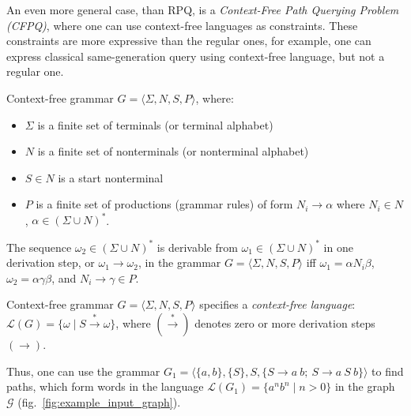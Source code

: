 An even more general case, than RPQ, is a \textit{Context-Free Path Querying Problem (CFPQ)}, where one can use context-free languages as constraints. These constraints are more expressive than the regular ones, for example, one can express classical same-generation query using context-free language, but not a regular one.

\begin{definition} 
Context-free grammar $G = \langle\Sigma, N, S, P\rangle$, where:
\begin{itemize}
    \item $\Sigma$ is a finite set of terminals (or terminal alphabet)
    \item $N$ is a finite set of nonterminals (or nonterminal alphabet)
    \item $S \in N$ is a start nonterminal
    \item $P$ is a finite set of productions (grammar rules) of form $N_i \to \alpha$ where  $N_i \in N$, $\alpha \in (\Sigma \cup N)^*$.
\end{itemize} 
\end{definition}

\begin{definition}
The sequence $\omega_2 \in (\Sigma \cup N)^*$ is derivable from $\omega_1 \in (\Sigma \cup N)^*$ in one derivation step, or $\omega_1 \to \omega_2$, in the grammar $G = \langle\Sigma, N, S, P\rangle$ iff $\omega_1=\alpha N_i \beta$, $\omega_2 = \alpha \gamma \beta$, and $N_i \to \gamma \in P$.
\end{definition}

\begin{definition}
Context-free grammar $G=\langle\Sigma, N, S, P\rangle$ specifies a \textit{context-free language}: $\mathcal{L}(G) = \{\omega \mid S \xrightarrow{*} \omega \}$, where $(\xrightarrow{*})$ denotes zero or more derivation steps $(\to)$.    
\end{definition}

Thus, one can use the grammar $G_1 = \langle \{a,b\}, \{S\}, S, \{S \to a \ b; \ S \to a \ S \ b\} \rangle$ to find paths, which form words in the language $\mathcal{L}(G_1) = \{a^n b^n \mid n > 0\}$ in the graph $\mathcal{G}$ (fig.~\ref{fig:example_input_graph}).


